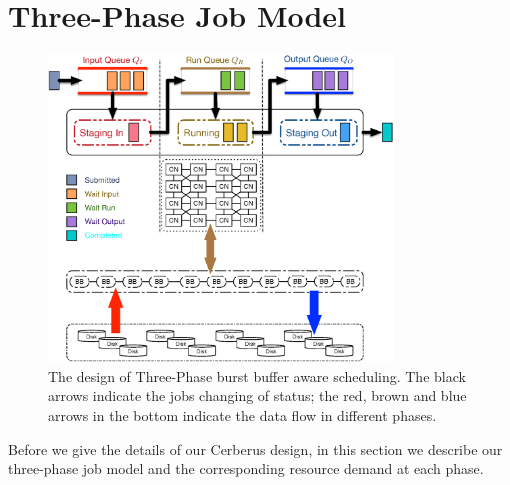 \section{Three-Phase Job Model}
\label{Sec:Model}

\begin{figure}[htp]
        \centering
        \includegraphics[width=3.6in]{CerberusBBSystem}
        \caption{The design of Three-Phase burst buffer aware scheduling. The black arrows indicate 
        the jobs changing of status; the red, brown and blue arrows in the bottom indicate the data flow in different phases.}
        \label{Fig:CerberusQueues}
\end{figure}

Before we give the details of our Cerberus design, 
in this section we describe our three-phase job model 
and the corresponding resource demand at each phase. 



